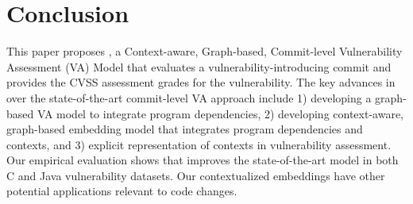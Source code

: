 \section{Conclusion}

This paper proposes {\tool}, a Context-aware, Graph-based,
Commit-level Vulnerability Assessment (VA) Model that evaluates a
vulnerabi\-lity-introducing commit and provides the CVSS assessment
grades for the vulnerability. The key advances in {\tool} over the
state-of-the-art commit-level VA approach include 1) developing a
graph-based VA model to integrate program dependencies, 2) developing
context-aware, graph-based embedding model that integrates program
dependencies and contexts, and 3) explicit representation of contexts
in vulnerability assessment. Our empirical evaluation shows that
{\tool} improves the state-of-the-art model in both C and Java
vulnerability datasets. Our contextualized embeddings have other
potential applications relevant to code changes.


















